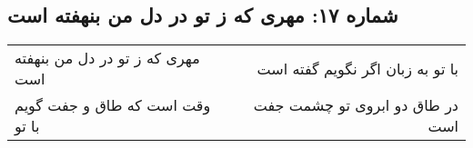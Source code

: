 \begin{center}
\section*{شماره ۱۷: مهری که ز تو در دل من بنهفته است}
\label{sec:017}
\begin{longtable}{l p{0.5cm} r}
مهری که ز تو در دل من بنهفته است
&&
با تو به زبان اگر نگویم گفته است
\\
وقت است که طاق و جفت گویم با تو
&&
در طاق دو ابروی تو چشمت جفت است
\\
\end{longtable}
\end{center}
